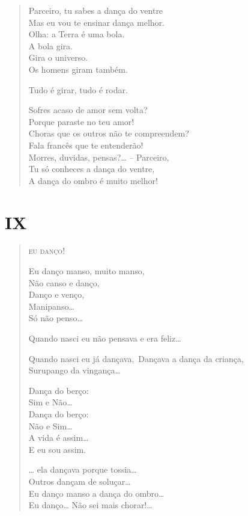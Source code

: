 \begin{verse}
Parceiro, tu sabes a dança do ventre\\
Mas eu vou te ensinar dança melhor.\\
Olha: a Terra é uma bola.\\
\quad\quad\quad\quad{}A bola gira.\\
\quad\quad\quad{}Gira o universo.\\
\quad\quad{}Os homens giram também.

Tudo é girar, tudo é rodar.

\quad{}Sofres acaso de amor sem volta?\\
\quad{}Porque paraste no teu amor!\\
\quad\quad{}Choras que os outros não te compreendem?\\
\quad\quad{}Fala francês que te entenderão!\\
\quad\quad\quad{}Morres, duvidas, pensas?\ldots{} -- Parceiro,\\
Tu só conheces a dança do ventre,\\
A dança do ombro é muito melhor!
\end{verse}

\pagebreak
\section*{IX}

\begin{verse}
\textsc{eu danço!}

Eu danço manso, muito manso,\\
Não canso e danço,\\
Danço e venço,\\
\quad{}Manipanso\ldots{}\\
\quad\quad{}Só não penso\ldots{}

Quando nasci eu não pensava e era feliz\ldots{}

Quando nasci eu já dançava,\
Dançava a dança da criança,\\
\quad{}Surupango da vingança\ldots{}

Dança do berço:\\
\quad{}Sim e Não\ldots{}\\
Dança do berço:\\
\quad{}Não e Sim\ldots{}\\
\quad\quad{}A vida é assim\ldots{}\\
E eu sou assim.

\ldots{} ela dançava porque tossia\ldots{}\\
\quad{}Outros dançam de soluçar\ldots{}\\
\quad\quad{}Eu danço manso a dança do ombro\ldots{}\\
\quad\quad\quad{}Eu danço\ldots{} Não sei mais chorar!\ldots{}
\end{verse}

